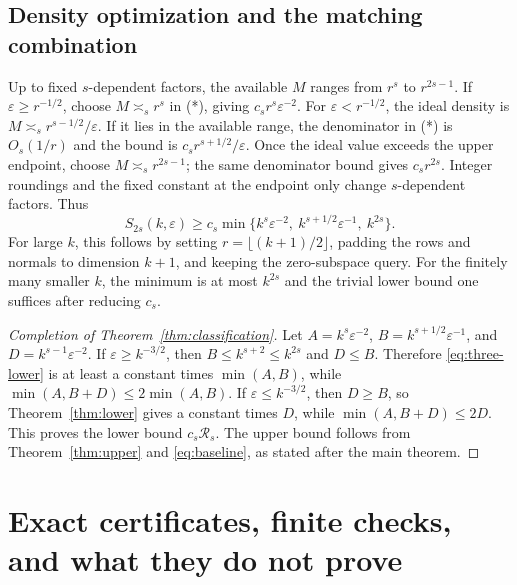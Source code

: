 \documentclass[11pt]{article}
\theoremstyle{remark}\newtheorem{remark}[theorem]{Remark}
\newcommand{\eps}{\varepsilon}\newcommand{\Sym}{\operatorname{Sym}}
\begin{document}
\subsection{Density optimization and the matching combination}
Up to fixed $s$-dependent factors, the available $M$ ranges from $r^s$ to $r^{2s-1}$. If $\eps\ge r^{-1/2}$, choose $M\asymp_s r^s$ in (*), giving $c_sr^s\eps^{-2}$. For $\eps<r^{-1/2}$, the ideal density is $M\asymp_s r^{s-1/2}/\eps$. If it lies in the available range, the denominator in (*) is $O_s(1/r)$ and the bound is $c_sr^{s+1/2}/\eps$. Once the ideal value exceeds the upper endpoint, choose $M\asymp_s r^{2s-1}$; the same denominator bound gives $c_sr^{2s}$. Integer roundings and the fixed constant at the endpoint only change $s$-dependent factors. Thus
\begin{equation}\label{eq:three-lower}
 S_{2s}(k,\eps)\ge c_s\min\{k^s\eps^{-2},\ k^{s+1/2}\eps^{-1},\ k^{2s}\}.
\end{equation}
For large $k$, this follows by setting $r=\lfloor(k+1)/2\rfloor$, padding the rows and normals to dimension $k+1$, and keeping the zero-subspace query. For the finitely many smaller $k$, the minimum is at most $k^{2s}$ and the trivial lower bound one suffices after reducing $c_s$.

\begin{proof}[Completion of Theorem~\ref{thm:classification}]
Let $A=k^s\eps^{-2}$, $B=k^{s+1/2}\eps^{-1}$, and $D=k^{s-1}\eps^{-2}$. If $\eps\ge k^{-3/2}$, then $B\le k^{s+2}\le k^{2s}$ and $D\le B$. Therefore \eqref{eq:three-lower} is at least a constant times $\min(A,B)$, while $\min(A,B+D)\le2\min(A,B)$. If $\eps\le k^{-3/2}$, then $D\ge B$, so Theorem~\ref{thm:lower} gives a constant times $D$, while $\min(A,B+D)\le2D$. This proves the lower bound $c_s\mathcal R_s$. The upper bound follows from Theorem~\ref{thm:upper} and \eqref{eq:baseline}, as stated after the main theorem.
\end{proof}

\section{Exact certificates, finite checks, and what they do not prove}\label{sec:verification}
\end{document}
